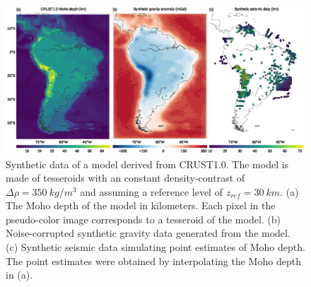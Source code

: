 \documentclass[extra,mreferee]{gji}
\begin{document}
\begin{figure}
    \centering
    \includegraphics[width=\textwidth]{figures/synthetic-crust1-data}
    \caption{
        Synthetic data of a model derived from CRUST1.0.
        The model is made of tesseroids with an constant density-contrast
        of $\Delta\rho = 350\ kg/m^3$ and assuming a reference level of
        $z_{ref} = 30\ km$.
        (a) The Moho depth of the model in kilometers.
        Each pixel in the pseudo-color image corresponds to a tesseroid of the
        model.
        (b) Noise-corrupted synthetic gravity data generated from the model.
        (c) Synthetic seismic data simulating point estimates of Moho depth.
        The point estimates were obtained by interpolating
        the Moho depth in (a).
    }
    \label{fig:crust1-data}
\end{figure}
\end{document}
